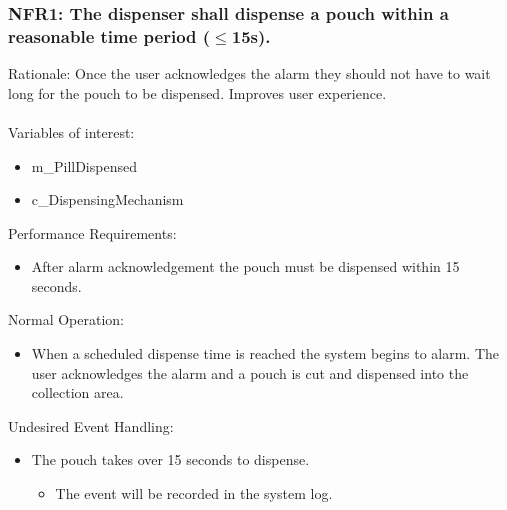 \documentclass[12pt]{article}
\begin{document}
\subsubsection*{NFR1: The dispenser shall dispense a pouch within a reasonable time period ($\leq$15s).}
Rationale: Once the user acknowledges the alarm they should not have to wait long for the pouch to be dispensed. Improves user experience.
\\\\
Variables of interest:
\begin{itemize}[noitemsep,topsep=0pt]
    \item m\_PillDispensed
    \item c\_DispensingMechanism
\end{itemize} 
\bigskip
Performance Requirements:
\begin{itemize}[noitemsep,topsep=0pt]
    \item After alarm acknowledgement the pouch must be dispensed within 15 seconds.
\end{itemize}
\bigskip
Normal Operation:
\begin{itemize}[noitemsep,topsep=0pt]
    \item When a scheduled dispense time is reached the system begins to alarm. The user acknowledges the alarm and a pouch is cut and dispensed into the collection area.
\end{itemize}
\bigskip
Undesired Event Handling:
\begin{itemize}[noitemsep,topsep=0pt]
    \item The pouch takes over 15 seconds to dispense.
    \begin{itemize}
        \item The event will be recorded in the system log.
    \end{itemize}
\end{itemize}
\bigskip

\end{document}
